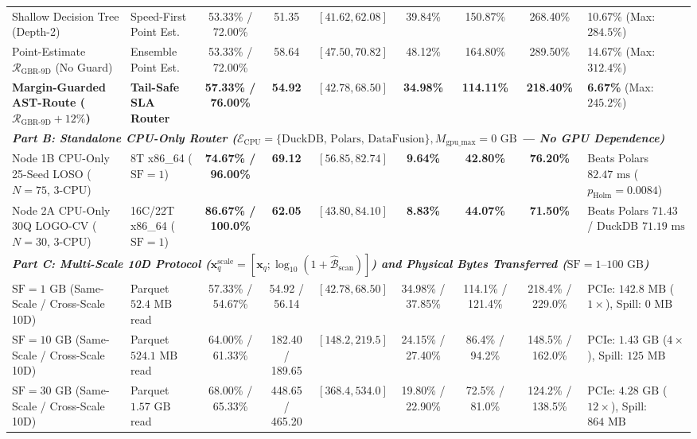 \documentclass[10pt,a4paper]{article}
\newenvironment{fitasttable}{%
  \begin{lrbox}{\asttblbox}%
}{%
  \end{lrbox}%
  \sbox{\asttblboxB}{%
    \ifdim\wd\asttblbox>0.96\textwidth
      \resizebox{0.96\textwidth}{!}{\usebox{\asttblbox}}%
    \else
      \usebox{\asttblbox}%
    \fi
  }%
  \ifdim\ht\asttblboxB>0.72\textheight
    \resizebox{!}{0.72\textheight}{\usebox{\asttblboxB}}%
  \else
    \usebox{\asttblboxB}%
  \fi
}
\begin{document}
\begin{table}[t!]
\begin{fitasttable}
\begin{tabular}{@{}llccccccl@{}}
Shallow Decision Tree (Depth-2) & Speed-First Point Est. & 53.33\% / 72.00\% & 51.35 & $[41.62, 62.08]$ & 39.84\% & 150.87\% & 268.40\% & 10.67\% (Max: $284.5\%$) \\
Point-Estimate $\mathcal{R}_{\text{GBR-9D}}$ (No Guard) & Ensemble Point Est. & 53.33\% / 72.00\% & 58.64 & $[47.50, 70.82]$ & 48.12\% & 164.80\% & 289.50\% & 14.67\% (Max: $312.4\%$) \\
\textbf{Margin-Guarded AST-Route ($\mathcal{R}_{\text{GBR-9D}}+12\%$)} & \textbf{Tail-Safe SLA Router} & \textbf{57.33\% / 76.00\%} & \textbf{54.92} & $[42.78, 68.50]$ & \textbf{34.98\%} & \textbf{114.11\%} & \textbf{218.40\%} & \textbf{6.67\%} (Max: $245.2\%$) \\
\hline
\multicolumn{9}{l}{\textit{\textbf{Part B: Standalone CPU-Only Router ($\mathcal{E}_{\text{CPU}}=\{\text{DuckDB, Polars, DataFusion}\}, M_{\text{gpu\_max}}=0\text{ GB}$ --- No GPU Dependence)}}} \\
Node 1B CPU-Only 25-Seed LOSO ($N=75$, 3-CPU) & 8T x86\_64 ($\text{SF}=1$) & \textbf{74.67\% / 96.00\%} & \textbf{69.12} & $[56.85, 82.74]$ & \textbf{9.64\%} & \textbf{42.80\%} & \textbf{76.20\%} & Beats Polars $82.47\text{ ms}$ ($p_{\text{Holm}}=0.0084$) \\
Node 2A CPU-Only 30Q LOGO-CV ($N=30$, 3-CPU) & 16C/22T x86\_64 ($\text{SF}=1$) & \textbf{86.67\% / 100.0\%} & \textbf{62.05} & $[43.80, 84.10]$ & \textbf{8.83\%} & \textbf{44.07\%} & \textbf{71.50\%} & Beats Polars $71.43$ / DuckDB $71.19\text{ ms}$ \\
\hline
\multicolumn{9}{l}{\textit{\textbf{Part C: Multi-Scale 10D Protocol ($\mathbf{x}_q^{\text{scale}}=[\mathbf{x}_q; \log_{10}(1+\hat{\mathcal{B}}_{\text{scan}})]$) and Physical Bytes Transferred ($\text{SF}=1\text{--}100\text{ GB}$)}}} \\
$\text{SF}=1\text{ GB}$ (Same-Scale / Cross-Scale 10D) & Parquet $52.4\text{ MB}$ read & 57.33\% / 54.67\% & 54.92 / 56.14 & $[42.78, 68.50]$ & 34.98\% / 37.85\% & 114.1\% / 121.4\% & 218.4\% / 229.0\% & PCIe: $142.8\text{ MB}$ ($1\times$), Spill: $0\text{ MB}$ \\
$\text{SF}=10\text{ GB}$ (Same-Scale / Cross-Scale 10D) & Parquet $524.1\text{ MB}$ read & 64.00\% / 61.33\% & 182.40 / 189.65 & $[148.2, 219.5]$ & 24.15\% / 27.40\% & 86.4\% / 94.2\% & 148.5\% / 162.0\% & PCIe: $1.43\text{ GB}$ ($4\times$), Spill: $125\text{ MB}$ \\
$\text{SF}=30\text{ GB}$ (Same-Scale / Cross-Scale 10D) & Parquet $1.57\text{ GB}$ read & 68.00\% / 65.33\% & 448.65 / 465.20 & $[368.4, 534.0]$ & 19.80\% / 22.90\% & 72.5\% / 81.0\% & 124.2\% / 138.5\% & PCIe: $4.28\text{ GB}$ ($12\times$), Spill: $864\text{ MB}$ \\

\end{tabular}
\end{fitasttable}
\end{table}
\end{document}

